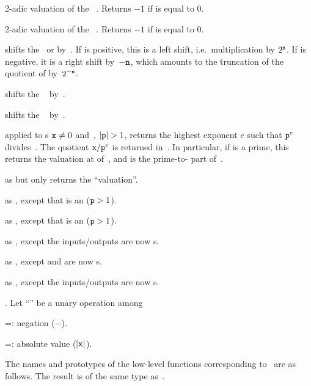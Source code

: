 
 2-adic valuation of the ~. Returns
$-1$ if  is equal to 0.

 2-adic valuation of the ~. Returns $-1$
if  is equal to 0.

 shifts the~ or
  by~. If  is positive, this is a left shift,
i.e.~multiplication by $2^{{\tt n}}$. If  is negative, it is a right
shift by~$-{\tt n}$, which amounts to the truncation of the quotient of 
by~$2^{-{\tt n}}$.

 shifts the ~ by~.

 shifts the ~ by~.

 applied to s
${\tt x}\neq 0$ and~, $|{\tt p}| > 1$, returns the highest
exponent $e$ such that ${\tt p}^{e}$ divides~. The quotient
${\tt x}/{\tt p}^{e}$ is returned in~. In particular, if  is a
prime, this returns the valuation at  of~, and  is
the prime-to- part of~.

 as  but only returns the
``valuation''.

 as , except
that  is an  (${\tt p} > 1$).

 as , except
that  is an  (${\tt p} > 1$).

 as ,
except the inputs/outputs are now s.

 as ,
except  and  are now s.

 as ,
except the inputs/outputs are now s.

. Let ``\op'' be a unary operation among

\op=: negation ($-$).


\op=: absolute value ($|{\tt x}|$).

\noindent The names and prototypes of the low-level functions corresponding
to \op\ are as follows. The result is of the same type as~.

